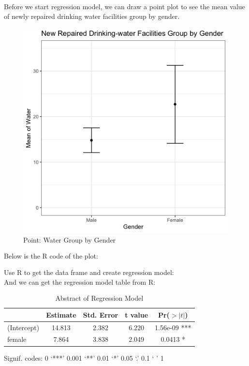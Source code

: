 \documentclass[12pt,letterpaper]{article}
\begin{document}
\begin{enumerate}
	Before we start regression model, we can draw a point plot to see the mean value of newly repaired drinking water facilities group by gender. \\
	\begin{figure}[h]
	\centering
	\caption{Point: Water Group by Gender}
	\includegraphics[scale=0.5]{Point&ci_Water_Groupby_Gender.png}
	\end{figure}
	
	Below is the R code of the plot:
	
	
	Use R to get the data frame and create regression model: \\
	
	
	And we can get the regression model table from R:
	
	\begin{table}[ht]
		\centering
		\caption{Abstract of Regression Model}
		\begin{tabular}{lcccc}
			\toprule
			& Estimate & Std. Error & t value & Pr($>|t|$) \\
			\midrule
			(Intercept) & 14.813 & 2.382 & 6.220 & 1.56e-09 *** \\
			female & 7.864 & 3.838 & 2.049 & 0.0413 * \\
			\bottomrule
		\end{tabular} 
	\end{table}
	Signif. codes:  0 ‘***’ 0.001 ‘**’ 0.01 ‘*’ 0.05 ‘.’ 0.1 ‘ ’ 1 \\
	

\end{enumerate}
\end{document}
